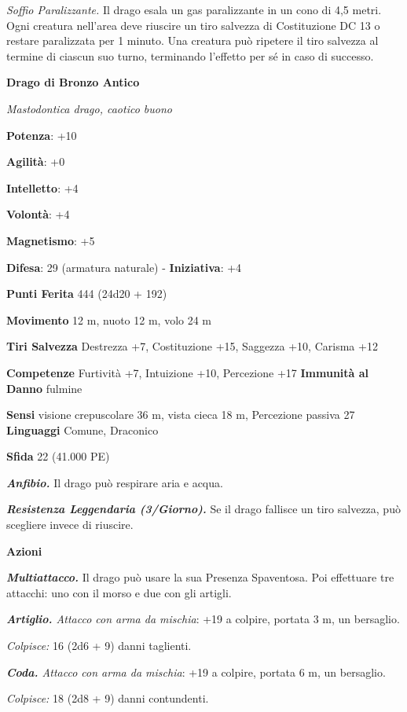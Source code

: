 \begin{multicols}{2}
\emph{Soffio Paralizzante.} Il drago esala un gas paralizzante in un
cono di 4,5 metri. Ogni creatura nell'area deve riuscire un tiro
salvezza di Costituzione DC 13 o restare paralizzata per 1 minuto. Una
creatura può ripetere il tiro salvezza al termine di ciascun suo turno,
terminando l'effetto per sé in caso di successo.



\textbf{Drago di Bronzo Antico}

\emph{Mastodontica drago, caotico buono}

\textbf{Potenza}: +10

\textbf{Agilità}: +0

\textbf{Intelletto}: +4

\textbf{Volontà}: +4

\textbf{Magnetismo}: +5

\textbf{Difesa}: 29 (armatura naturale) - \textbf{Iniziativa}: +4

\textbf{Punti Ferita} 444 (24d20 + 192)

\textbf{Movimento} 12 m, nuoto 12 m, volo 24 m

\textbf{Tiri Salvezza} Destrezza +7, Costituzione +15, Saggezza +10,
Carisma +12

\textbf{Competenze} Furtività +7, Intuizione +10, Percezione +17
\textbf{Immunità al Danno} fulmine

\textbf{Sensi} visione crepuscolare 36 m, vista cieca 18 m, Percezione passiva
27 \textbf{Linguaggi} Comune, Draconico

\textbf{Sfida} 22 (41.000 PE)

\emph{\textbf{Anfibio.}} Il drago può respirare aria e acqua.

\emph{\textbf{Resistenza Leggendaria (3/Giorno).}} Se il drago fallisce
un tiro salvezza, può scegliere invece di riuscire.

\textbf{Azioni}

\emph{\textbf{Multiattacco.}} Il drago può usare la sua Presenza
Spaventosa. Poi effettuare tre attacchi: uno con il morso e due con gli
artigli.

\emph{\textbf{Artiglio.} Attacco con arma da mischia}: +19 a colpire,
portata 3 m, un bersaglio.

\emph{Colpisce:} 16 (2d6 + 9) danni taglienti.

\emph{\textbf{Coda.} Attacco con arma da mischia}: +19 a colpire,
portata 6 m, un bersaglio.

\emph{Colpisce:} 18 (2d8 + 9) danni contundenti.


\end{multicols}
